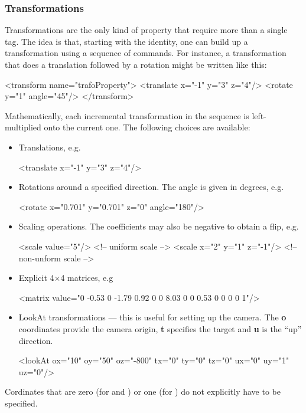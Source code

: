 \subsubsection{Transformations}
Transformations are the only kind of property that require more than a single tag. The idea is that, starting
with the identity, one can build up a transformation using a sequence of commands. For instance, a transformation that 
does a translation followed by a rotation might be written like this:
\begin{xml}
<transform name="trafoProperty">
	<translate x="-1" y="3" z="4"/>
	<rotate y="1" angle="45"/>
</transform>
\end{xml}
Mathematically, each incremental transformation in the sequence is left-multiplied onto the current one. The following
choices are available:
\begin{itemize}
\item Translations, e.g.
\begin{xml}
<translate x="-1" y="3" z="4"/>
\end{xml}
\item Rotations around a specified direction. The angle is given in degrees, e.g.
\begin{xml}
<rotate x="0.701" y="0.701" z="0" angle="180"/>
\end{xml}
\item Scaling operations. The coefficients may also be negative to obtain a flip, e.g.
\begin{xml}
<scale value="5"/>           <!-- uniform scale -->
<scale x="2" y="1" z="-1"/>  <!-- non-unform scale -->
\end{xml}
\item Explicit 4$\times$4 matrices, e.g
\begin{xml}
<matrix value="0 -0.53 0 -1.79 0.92 0 0 8.03 0 0 0.53 0 0 0 0 1"/>
\end{xml}
\item LookAt transformations --- this is useful for setting up the camera. The \textbf{o} coordinates
provide the camera origin, \textbf{t} specifies the target and \textbf{u} is the ``up'' direction.
\begin{xml}
<lookAt ox="10" oy="50" oz="-800" tx="0" ty="0" tz="0" ux="0" uy="1" uz="0"/>
\end{xml}
\end{itemize}
Cordinates that are zero (for  and ) or one (for )
do not explicitly have to be specified.
\newpage
